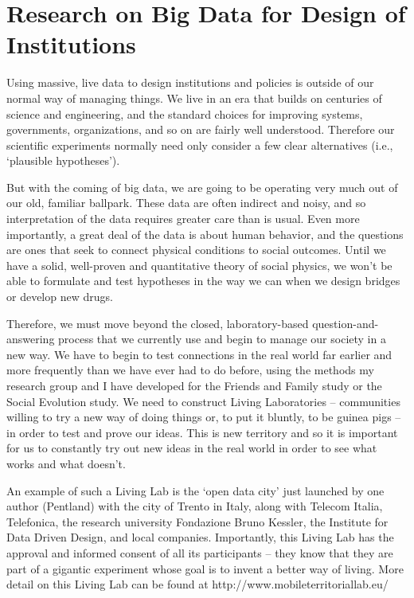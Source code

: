 \section{Research on Big Data for Design of Institutions}

Using massive, live data to design institutions and policies is outside of our normal way of managing things. We live in an era that builds on centuries of science and engineering, and the standard choices for improving systems, governments, organizations, and so on are fairly well understood. Therefore our scientific experiments normally need only consider a few clear alternatives (i.e., ‘plausible hypotheses’).

But with the coming of big data, we are going to be operating very much out of our old, familiar ballpark. These data are often indirect and noisy, and so interpretation of the data requires greater care than is usual. Even more importantly, a great deal of the data is about human behavior, and the questions are ones that seek to connect physical conditions to social outcomes. Until we have a solid, well-proven and quantitative theory of social physics, we won’t be able to formulate and test hypotheses in the way we can when we design bridges or develop new drugs.

Therefore, we must move beyond the closed, laboratory-based question-and-answering process that we currently use and begin to manage our society in a new way. We have to begin to test connections in the real world far earlier and more frequently than we have ever had to do before, using the methods my research group and I have developed for the Friends and Family study or the Social Evolution study. We need to construct Living Laboratories – communities willing to try a new way of doing things or, to put it bluntly, to be guinea pigs – in order to test and prove our ideas. This is new territory and so it is important for us to constantly try out new ideas in the real world in order to see what works and what doesn’t.

An example of such a Living Lab is the `open data city’ just launched by one author (Pentland) with the city of Trento in Italy, along with Telecom Italia, Telefonica, the research university Fondazione Bruno Kessler, the Institute for Data Driven Design, and local companies. Importantly, this Living Lab has the approval and informed consent of all its participants – they know that they are part of a gigantic experiment whose goal is to invent a better way of living. More detail on this Living Lab can be found at http://www.mobileterritoriallab.eu/

